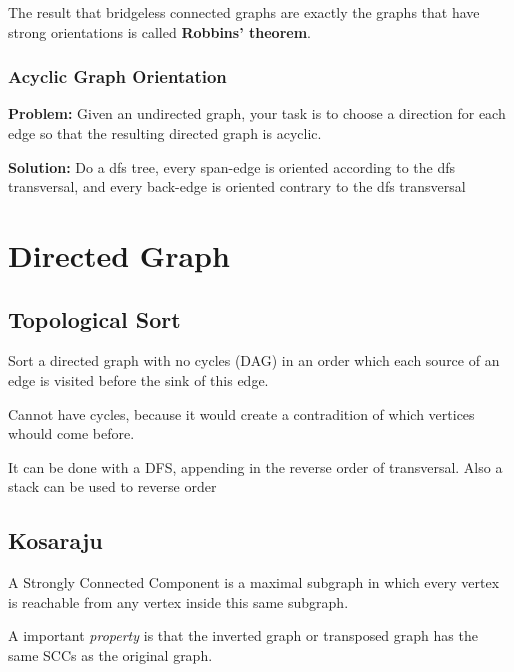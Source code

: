 
	The result that bridgeless connected graphs are exactly the graphs that have strong orientations is called \textbf{Robbins' theorem}.

		\subsubsection{Acyclic Graph Orientation}

			\textbf{Problem:} Given an undirected graph, your task is to choose a direction for each edge so that the resulting directed graph is acyclic.

			\textbf{Solution:} Do a dfs tree, every span-edge is oriented according to the dfs transversal,
			and every back-edge is oriented contrary to the dfs transversal


\section{Directed Graph}

	\subsection{Topological Sort}

	Sort a directed graph with no cycles (DAG) in an order which each source of an edge is visited before the sink of this edge.

	Cannot have cycles, because it would create a contradition of which vertices whould come before.

	It can be done with a DFS, appending in the reverse order of transversal. Also a stack can be used to reverse order	


    \vspace{5pts}
	
	\subsection{Kosaraju}

	A Strongly Connected Component is a maximal subgraph in which every vertex is reachable
	from any vertex inside this same subgraph.

	A important \textit{property} is that the inverted graph or transposed graph has the same SCCs
	as the original graph.

